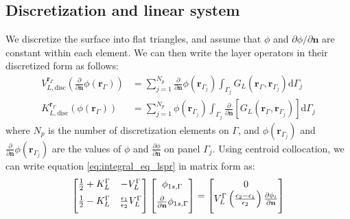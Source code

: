 \subsection{Discretization and linear system}

We discretize the surface into flat triangles, and assume that  $\phi$ and 
$\partial \phi/\partial \mathbf{n}$ are constant within each element. We can
then write the layer operators in their discretized form as follows:
%
\begin{align} \label{eq:layers_disc}
V_{L,\text{disc}}^{\mathbf{r}_\Gamma} \left( \frac{\partial}{\partial \mathbf{n}} \phi(\mathbf{r}_{\Gamma}) \right) &= \sum_{j=1}^{N_p} \frac{\partial}{\partial \mathbf{n}} \phi(\mathbf{r}_{\Gamma_j}) \int_{\Gamma_j} G_L(\mathbf{r}_\Gamma,\mathbf{r}_{\Gamma_j})  \mathrm{d} \Gamma_j  \nonumber \\
K_{L,\text{disc}}^{\mathbf{r}_\Gamma}(\phi(\mathbf{r}_{\Gamma})) &=  \sum_{j=1}^{N_p}\phi(\mathbf{r}_{\Gamma_j})\int_{\Gamma_j} \frac{\partial}{\partial \mathbf{n}} \left[ G_L(\mathbf{r}_\Gamma,\mathbf{r}_{\Gamma_j}) \right]\mathrm{d} \Gamma_j
\end{align}
%
where $N_p$ is the number of discretization elements on $\Gamma$, 
and $\phi(\mathbf{r}_{\Gamma_j})$ and $\frac{\partial}{\partial \mathbf{n}} 
\phi(\mathbf{r}_{\Gamma_j})$ are the values of $\phi$ and 
$\frac{\partial \phi}{\partial \mathbf{n}}$ on panel $\Gamma_j$.
Using centroid collocation, we can write equation \eqref{eq:integral_eq_lspr} in matrix form as:
%
 \begin{equation} \label{eq:matrix_lspr}
 \left[
    \begin{matrix} 
       \frac{1}{2} + K_{L}^{\Gamma} & -V_{L}^{\Gamma}  \vspace{0.2cm} \\
       \frac{1}{2} - K_{L}^{\Gamma} &  \frac{\epsilon_1}{\epsilon_2} V_{L}^{\Gamma}  \vspace{0.2cm} 
    \end{matrix}
    \right] \left[ 
    \begin{matrix} 
       \phi_{1s,\Gamma} \vspace{0.2cm} \\
       \frac{\partial}{\partial \mathbf{n}} \phi_{1s,\Gamma} \vspace{0.2cm}
    \end{matrix} 
     \right] =   
    \left[
    \begin{matrix} 
       0 \\
       V_{L}^{\Gamma} \left(\frac{\epsilon_2-\epsilon_1}{\epsilon_2}\right) \frac{\partial\phi_i}{\partial\mathbf{n}} \vspace{0.2cm} 
    \end{matrix}
    \right]
 \end{equation}
